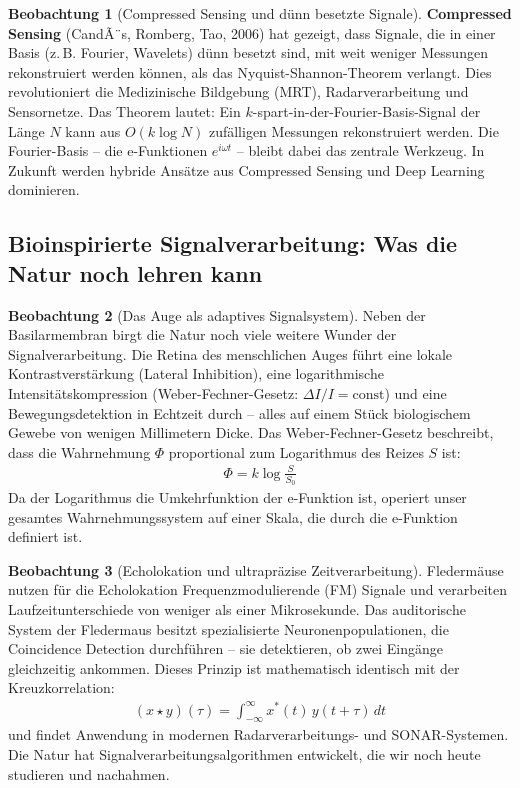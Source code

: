 ﻿\documentclass[a4paper,12pt]{report}
\theoremstyle{definition}
\newtheorem{beobachtung}{Beobachtung}
\begin{document}
	\begin{beobachtung}[Compressed Sensing und dünn besetzte Signale]
		\textbf{Compressed Sensing} (CandÃ¨s, Romberg, Tao, 2006) hat gezeigt, dass Signale, die in einer Basis (z.\,B. Fourier, Wavelets) dünn besetzt sind, mit weit weniger Messungen rekonstruiert werden können, als das Nyquist-Shannon-Theorem verlangt. Dies revolutioniert die Medizinische Bildgebung (MRT), Radarverarbeitung und Sensornetze. Das Theorem lautet: Ein $k$-spart-in-der-Fourier-Basis-Signal der Länge $N$ kann aus $O(k \log N)$ zufälligen Messungen rekonstruiert werden. Die Fourier-Basis -- die e-Funktionen $e^{i\omega t}$ -- bleibt dabei das zentrale Werkzeug. In Zukunft werden hybride Ansätze aus Compressed Sensing und Deep Learning dominieren.
	\end{beobachtung}
	
	\subsection{Bioinspirierte Signalverarbeitung: Was die Natur noch lehren kann}
	
	\begin{beobachtung}[Das Auge als adaptives Signalsystem]
		Neben der Basilarmembran birgt die Natur noch viele weitere Wunder der Signalverarbeitung. Die Retina des menschlichen Auges führt eine lokale Kontrastverstärkung (Lateral Inhibition), eine logarithmische Intensitätskompression (Weber-Fechner-Gesetz: $\Delta I / I = \text{const}$) und eine Bewegungsdetektion in Echtzeit durch -- alles auf einem Stück biologischem Gewebe von wenigen Millimetern Dicke. Das Weber-Fechner-Gesetz beschreibt, dass die Wahrnehmung $\Phi$ proportional zum Logarithmus des Reizes $S$ ist:
		\begin{align}
			\Phi = k \log\frac{S}{S_0}
		\end{align}
		Da der Logarithmus die Umkehrfunktion der e-Funktion ist, operiert unser gesamtes Wahrnehmungssystem auf einer Skala, die durch die e-Funktion definiert ist.
	\end{beobachtung}
	
	\begin{beobachtung}[Echolokation und ultrapräzise Zeitverarbeitung]
		Fledermäuse nutzen für die Echolokation Frequenzmodulierende (FM) Signale und verarbeiten Laufzeitunterschiede von weniger als einer Mikrosekunde. Das auditorische System der Fledermaus besitzt spezialisierte Neuronenpopulationen, die Coincidence Detection durchführen -- sie detektieren, ob zwei Eingänge gleichzeitig ankommen. Dieses Prinzip ist mathematisch identisch mit der Kreuzkorrelation:
		\begin{align}
			(x \star y)(\tau) = \int_{-\infty}^{\infty} x^*(t)\, y(t + \tau)\, dt
		\end{align}
		und findet Anwendung in modernen Radarverarbeitungs- und SONAR-Systemen. Die Natur hat Signalverarbeitungsalgorithmen entwickelt, die wir noch heute studieren und nachahmen.
	\end{beobachtung}
	
\end{document}
